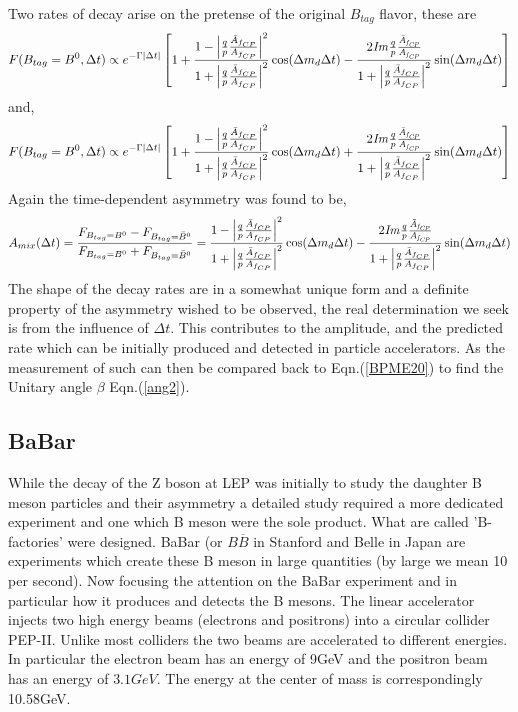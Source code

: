 Two rates of decay arise on the pretense of the original $B_{tag}$ flavor, these are
\begin{equation}\label{BPME17}
F(B_{tag}=B^{0},\Delta t) \propto
 e^{-\Gamma |\Delta t|}
\left[1+\frac{1-\left|\frac{q}{p}\frac{\bar{A}_{f_{CP}}}{A_{f_{CP}}}
\right|^{2}}{1+\left|\frac{q}{p}\frac{\bar{A}_{f_{CP}}}{A_{f_{CP}}}\right|^{2}}\cos(\Delta m_{d}\Delta t) - 
\frac{2\it{I}m\frac{q}{p}\frac{\bar{A}_{f_{CP}}}{A_{f_{CP}}}}
{1+\left|\frac{q}{p}\frac{\bar{A}_{f_{CP}}}{A_{f_{CP}}}
\right|^{2}}
\sin(\Delta m_{d} \Delta t)\right]
\end{equation}
and,
\begin{equation}\label{BPME18}
F(B_{tag}=B^{0},\Delta t) \propto
 e^{-\Gamma |\Delta t|}
\left[1+\frac{1-\left|\frac{q}{p}\frac{\bar{A}_{f_{CP}}}{A_{f_{CP}}}
\right|^{2}}{1+\left|\frac{q}{p}\frac{\bar{A}_{f_{CP}}}{A_{f_{CP}}}\right|^{2}}\cos(\Delta m_{d}\Delta t) + 
\frac{2\it{I}m\frac{q}{p}\frac{\bar{A}_{f_{CP}}}{A_{f_{CP}}}}
{1+\left|\frac{q}{p}\frac{\bar{A}_{f_{CP}}}{A_{f_{CP}}}
\right|^{2}}
\sin(\Delta m_{d} \Delta t)\right]
\end{equation}
Again the time-dependent asymmetry was found \cite{B6} to be,
\begin{equation}\label{BPME19}
A_{mix}(\Delta t) = \frac{F_{B_{tag}=B^0}-F_{B_{tag}=\bar{B}^0}}{F_{B_{tag}=B^0}+F_{B_{tag}=\bar{B}^0}} = \frac{1-\left|\frac{q}{p}\frac{\bar{A}_{f_{CP}}}{A_{f_{CP}}}
\right|^{2}}{1+\left|\frac{q}{p}\frac{\bar{A}_{f_{CP}}}{A_{f_{CP}}}\right|^{2}}\cos(\Delta m_{d}\Delta t) - 
\frac{2\it{I}m\frac{q}{p}\frac{\bar{A}_{f_{CP}}}{A_{f_{CP}}}}
{1+\left|\frac{q}{p}\frac{\bar{A}_{f_{CP}}}{A_{f_{CP}}}
\right|^{2}}
\sin(\Delta m_{d} \Delta t)
\end{equation}
The shape of the decay rates are in a somewhat unique form and a definite property of the asymmetry wished to be observed, the real determination we seek is from the influence of $\Delta t$. This contributes to the amplitude, and the predicted rate which can be initially produced and detected in particle accelerators. As the measurement of such can then be compared back to Eqn.(\ref{BPME20}) to find the Unitary angle $\beta$ Eqn.(\ref{ang2}).


\subsection{BaBar}
While the decay of the Z boson at LEP was initially to study the daughter B meson particles and their asymmetry a detailed study required a more dedicated experiment and one which B meson were the sole product. What are called 'B-factories' were designed. BaBar (or $B\overline{B}$ in Stanford and Belle in Japan are experiments which create these B meson in large quantities (by large we mean 10 per second). Now focusing the attention on the BaBar experiment and in particular how it produces and detects the B mesons. The linear accelerator injects two high energy beams (electrons and positrons) into a circular collider PEP-II. Unlike most colliders the two beams are accelerated to different energies. In particular the electron beam has an energy of 9GeV and the positron beam has an energy of $3.1GeV$. The energy at the center of mass is correspondingly 10.58GeV.

